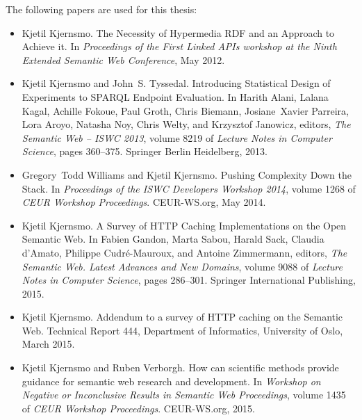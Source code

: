 \documentclass[a4paper, 12pt, twoside]{uiophd}
\begin{document}
The following papers are used for this thesis:
\begin{itemize}
\item Kjetil Kjernsmo.
\newblock The Necessity of Hypermedia RDF and an Approach to Achieve it.
\newblock In {\em Proceedings of the First Linked APIs workshop at the Ninth
  Extended Semantic Web Conference}, May 2012.
\item Kjetil Kjernsmo and John~S. Tyssedal.
\newblock Introducing Statistical Design of Experiments to SPARQL Endpoint
  Evaluation.
\newblock In Harith Alani, Lalana Kagal, Achille Fokoue, Paul Groth, Chris
  Biemann, Josiane~Xavier Parreira, Lora Aroyo, Natasha Noy, Chris Welty, and
  Krzysztof Janowicz, editors, {\em The Semantic Web – ISWC 2013}, volume
  8219 of {\em Lecture Notes in Computer Science}, pages 360--375. Springer
  Berlin Heidelberg, 2013.
\item Gregory~Todd Williams and Kjetil Kjernsmo.
\newblock Pushing Complexity Down the Stack.
\newblock In {\em Proceedings of the ISWC Developers Workshop 2014}, volume
  1268 of {\em {CEUR} Workshop Proceedings}. CEUR-WS.org, May 2014.
\item Kjetil Kjernsmo.
\newblock A Survey of HTTP Caching Implementations on the Open Semantic Web.
\newblock In Fabien Gandon, Marta Sabou, Harald Sack, Claudia d’Amato,
  Philippe Cudré-Mauroux, and Antoine Zimmermann, editors, {\em The Semantic
  Web. Latest Advances and New Domains}, volume 9088 of {\em Lecture Notes in
  Computer Science}, pages 286--301. Springer International
  Publishing, 2015.
\item Kjetil Kjernsmo.
\newblock Addendum to a survey of {HTTP} caching on the {Semantic Web}.
\newblock Technical Report 444, Department of Informatics, University of Oslo,
  March 2015.
\item Kjetil Kjernsmo and Ruben Verborgh.
\newblock How can scientific methods provide guidance for semantic web research
  and development.
\newblock In {\em Workshop on Negative or Inconclusive Results in Semantic Web
  Proceedings}, volume 1435 of {\em {CEUR} Workshop Proceedings}. CEUR-WS.org,
  2015.
\end{itemize}









\end{document}
